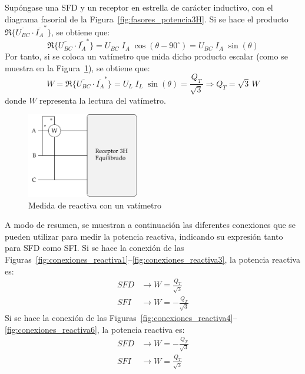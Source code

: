 Supóngase una SFD y un receptor en estrella de carácter inductivo, con el diagrama fasorial de la Figura~\ref{fig:fasores_potencia3H}. Si se hace el producto $\Re\{\overline{U_{BC}} \cdot \overline{I_A}^*\}$, se obtiene que:
\begin{equation*}
    \Re\{\overline{U_{BC}} \cdot \overline{I_A}^*\} = U_{BC}\;I_A\;\cos(\theta-90^\circ)=U_{BC}\;I_A\;\sin(\theta)
\end{equation*}
Por tanto, si se coloca un vatímetro que mida dicho producto escalar (como se muestra en la Figura~\ref{fig:Reactiva3H_A-BC}), se obtiene que: 
\begin{equation}
    W=\Re\{\overline{U_{BC}} \cdot \overline{I_A}^*\}=U_{L}\;I_L\;\sin(\theta)=\dfrac{Q_T}{\sqrt{3}}\Rightarrow \boxed{Q_T=\sqrt{3}\,W}
\end{equation}
donde $W$ representa la lectura del vatímetro. 
\begin{figure}[H]
    \centering
    \includegraphics[height=3.7cm]{../figs/Reactiva3H_A-BC.pdf}
    \caption{Medida de reactiva con un vatímetro}
    \label{fig:Reactiva3H_A-BC}
\end{figure}

A modo de resumen, se muestran a continuación las diferentes conexiones que se pueden utilizar para medir la potencia reactiva, indicando su expresión tanto para SFD como SFI. Si se hace la conexión de las Figuras~\ref{fig:conexiones_reactiva1}--\ref{fig:conexiones_reactiva3}, la potencia reactiva es:
\begin{align}
SFD &\rightarrow \boxed{W = \frac{Q_T}{\sqrt{3}}}\\
SFI &\rightarrow \boxed{W =  - \frac{Q_T}{\sqrt{3}}}
\end{align}
Si se hace la conexión de las Figuras~\ref{fig:conexiones_reactiva4}--\ref{fig:conexiones_reactiva6}, la potencia reactiva es:
\begin{align}
SFD &\rightarrow \boxed{W = - \frac{Q_T}{\sqrt{3}}}\\
SFI &\rightarrow \boxed{W = \frac{Q_T}{\sqrt{3}}}
\end{align}

